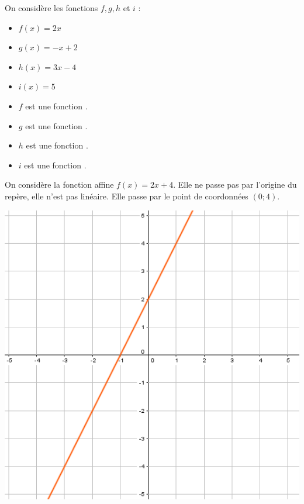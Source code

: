 \documentclass[12pt,a4paper]{article}
\date{}
\title{}
\begin{document}
\begin{myexs}
	On considère les fonctions $f,g,h$ et $i$ :
	\begin{multicols}{2}
		\begin{itemize}
			\item $f(x)=2x$
			\item $g(x)=-x+2$
			\item $h(x)=3x-4$
			\item $i(x)=5$
		\end{itemize}
	\end{multicols}
	
	\begin{itemize}
		\item $f$ est une fonction .
		\item $g$ est une fonction .
		\item $h$ est une fonction .
		\item $i$ est une fonction .
	\end{itemize}
\end{myexs}


\begin{myex}
	\begin{multicols}{2}
		\vspace*{1.5cm}
		On considère la fonction affine $f(x)=2x+4$. Elle ne passe pas par l'origine du repère, elle n'est pas linéaire. Elle passe par le point de coordonnées $(0;4)$.
		
		\includegraphics[scale=0.5]{img/ex1}
	\end{multicols}
\end{myex}
\end{document}
